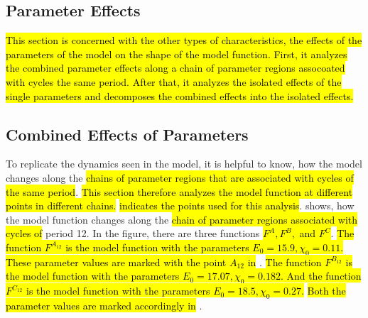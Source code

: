 \subsection{Parameter Effects}
\label{sec:setup.char.paramfx}

\hl{
	This section is concerned with the other types of characteristics, the effects of the parameters of the model on the shape of the model function.
	First, it analyzes the combined parameter effects along a chain of parameter regions assocoated with cycles the same period.
	After that, it analyzes the isolated effects of the single parameters and decomposes the combined effects into the isolated effects.
}

\subsection{Combined Effects of Parameters}
\label{sec:setup.char.paramfx.combined}

To replicate the dynamics seen in the model, it is helpful to know, how the model changes along the \hl{chains of parameter regions that are associated with cycles of the same period}.
\hl{
	This section therefore analyzes the model function at different points in different chains.
}
 \hl{indicates the points used for this analysis}.
 shows, how the model function changes along the \hl{chain of parameter regions associated with cycles of} period 12.
In the figure, there are three functions \hl{$F^A, F^B,$ and $F^C$}.
\hl{
	The function $F^{A_{12}}$ is the model function with the parameters $E_0 = 15.9, \chi_0 = 0.11$.
}
\hl{These parameter values are marked with the point $A_{12}$ in} .
\hl{
	The function $F^{B_{12}}$ is the model function with the parameters $E_0 = 17.07, \chi_0 = 0.182$.
	And the function $F^{C_{12}}$ is the model function with the parameters $E_0 = 18.5, \chi_0 = 0.27$.
}
\hl{Both the parameter values are marked accordingly in} .

